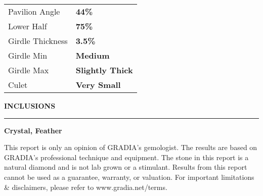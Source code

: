 \documentclass[12pt,landscape]{article}%
\begin{document}
\begin{minipage}[t]{1\textwidth}
\begin{minipage}[t]{0.33333\textwidth}
\begin{minipage}[t]{0.9\textwidth}
\begin{tabular}{l l}
Pavilion Angle&\textbf{44\%}\\%
Lower Half&\textbf{75\%}\\%
Girdle Thickness&\textbf{3.5\%}\\%
Girdle Min&\textbf{Medium}\\%
Girdle Max&\textbf{Slightly Thick}\\%
Culet&\textbf{Very Small}\\%
\end{tabular}%
\vspace*{2em}%
\linebreak%
\color{MyBlue}%
\textbf{INCLUSIONS\newline%
}%
\noindent\rule{\textwidth}{0.5mm}%
\vspace*{1em}%
\linebreak%
\color{MyDarkGrey}%
\textbf{Crystal, Feather}%
\vspace*{1em}%
\linebreak%
%
\begin{footnotesize}%
This report is only an opinion of GRADIA’s gemologist. The results are based on GRADIA’s professional technique and equipment. The stone in this report is a natural diamond and is not lab grown or a stimulant. Results from this report cannot be used as a guarantee, warranty, or valuation. For important limitations \& disclaimers, please refer to www.gradia.net/terms.%
\end{footnotesize}%
\end{minipage}%
\end{minipage}%
\end{minipage}%
\end{document}

